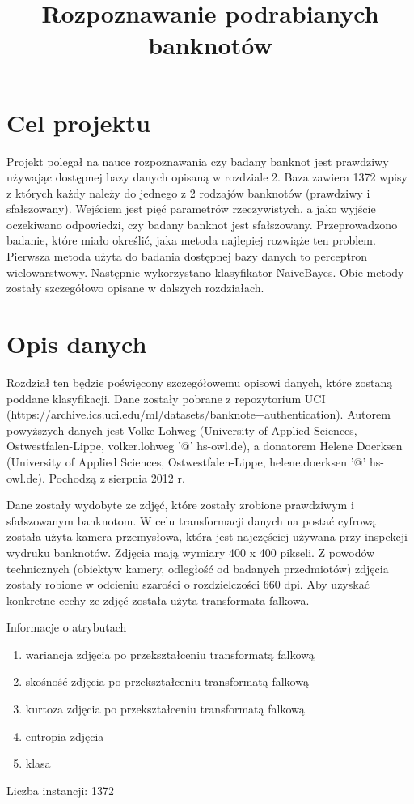 \documentclass{classrep}
\author{
  \studentinfo{Norbert Landrat}{213518} \and
  \studentinfo{Adrian Grzelak}{213506}
}
\title{Rozpoznawanie podrabianych banknotów}
\begin{document}
\maketitle

\section{Cel projektu}
Projekt polegał na nauce rozpoznawania czy badany banknot jest prawdziwy używając dostępnej bazy danych opisaną w rozdziale 2. Baza zawiera 1372 wpisy z których każdy należy do jednego z 2 rodzajów banknotów (prawdziwy i sfałszowany). Wejściem jest pięć parametrów rzeczywistych, a jako wyjście oczekiwano odpowiedzi, czy badany banknot jest sfałszowany. Przeprowadzono badanie, które miało określić, jaka metoda najlepiej rozwiąże ten problem. Pierwsza metoda użyta do badania dostępnej bazy danych to perceptron wielowarstwowy. Następnie wykorzystano klasyfikator NaiveBayes. Obie metody zostały szczegółowo opisane w dalszych rozdziałach.

\section{Opis danych}
Rozdział ten będzie poświęcony szczegółowemu opisowi danych, które zostaną poddane klasyfikacji. Dane zostały pobrane z repozytorium UCI (https://archive.ics.uci.edu/ml/datasets/banknote+authentication). Autorem powyższych danych jest Volke Lohweg (University of Applied Sciences, Ostwestfalen-Lippe, volker.lohweg '@' hs-owl.de), a donatorem Helene Doerksen (University of Applied Sciences, Ostwestfalen-Lippe, helene.doerksen '@' hs-owl.de). Pochodzą z sierpnia 2012 r.

Dane zostały wydobyte ze zdjęć, które zostały zrobione prawdziwym i sfałszowanym banknotom. W celu transformacji danych na postać cyfrową została użyta kamera przemysłowa, która jest najczęściej używana przy inspekcji wydruku banknotów. Zdjęcia mają wymiary 400 x 400 pikseli. Z powodów technicznych (obiektyw kamery, odległość od badanych przedmiotów) zdjęcia zostały robione w odcieniu szarości  o rozdzielczości 660 dpi. Aby uzyskać konkretne cechy ze zdjęć została użyta transformata falkowa. 

Informacje o atrybutach
\begin{enumerate}
\item wariancja zdjęcia po przekształceniu transformatą falkową
\item skośność zdjęcia po przekształceniu transformatą falkową
\item kurtoza zdjęcia po przekształceniu transformatą falkową
\item entropia zdjęcia
\item klasa
\end{enumerate}
Liczba instancji: 1372
\end{document}
